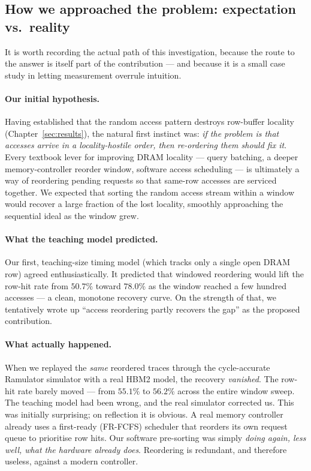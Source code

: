\documentclass[11pt,a4paper]{article}
\begin{document}
\subsection{How we approached the problem: expectation vs.\ reality}

It is worth recording the actual path of this investigation, because the route to the answer is
itself part of the contribution --- and because it is a small case study in letting measurement
overrule intuition.

\paragraph{Our initial hypothesis.} Having established that the random access pattern destroys
row-buffer locality (Chapter~\ref{sec:results}), the natural first instinct was: \emph{if the problem
is that accesses arrive in a locality-hostile order, then re-ordering them should fix it}. Every
textbook lever for improving DRAM locality --- query batching, a deeper memory-controller reorder
window, software access scheduling --- is ultimately a way of reordering pending requests so that
same-row accesses are serviced together. We expected that sorting the random access stream within a
window would recover a large fraction of the lost locality, smoothly approaching the sequential
ideal as the window grew.

\paragraph{What the teaching model predicted.} Our first, teaching-size timing model (which tracks
only a single open DRAM row) agreed enthusiastically. It predicted that windowed reordering would
lift the row-hit rate from $50.7\%$ toward $78.0\%$ as the window reached a few hundred accesses --- a
clean, monotone recovery curve. On the strength of that, we tentatively wrote up ``access reordering
partly recovers the gap'' as the proposed contribution.

\paragraph{What actually happened.} When we replayed the \emph{same} reordered traces through the
cycle-accurate Ramulator simulator with a real HBM2 model, the recovery \emph{vanished}. The row-hit
rate barely moved --- from $55.1\%$ to $56.2\%$ across the entire window sweep. The teaching model had
been wrong, and the real simulator corrected us. This was initially surprising; on reflection it is
obvious. A real memory controller already uses a first-ready (FR-FCFS) scheduler that reorders its
own request queue to prioritise row hits. Our software pre-sorting was simply \emph{doing again,
less well, what the hardware already does}. Reordering is redundant, and therefore useless, against a
modern controller.
\end{document}
